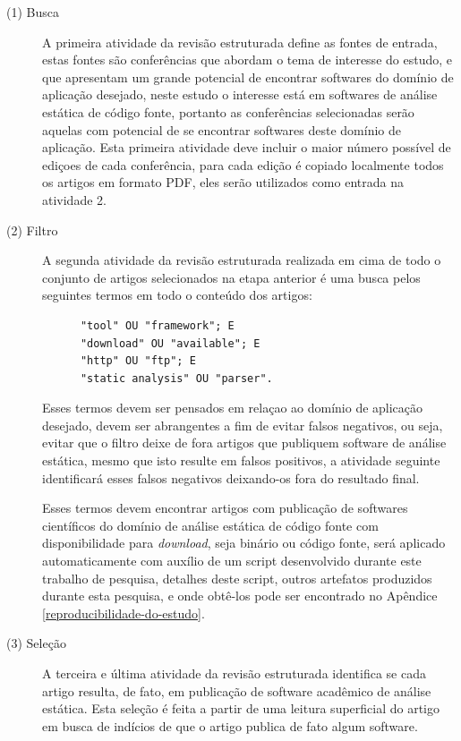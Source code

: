 \begin{description}

  \item[(1) Busca]
    A primeira atividade da revisão estruturada define as fontes de entrada,
    estas fontes são conferências que abordam o tema de interesse do estudo, e
    que apresentam um grande potencial de encontrar softwares do domínio de
    aplicação desejado, neste estudo o interesse está em softwares de análise
    estática de código fonte, portanto as conferências selecionadas serão
    aquelas com potencial de se encontrar softwares deste domínio de aplicação.
    Esta primeira atividade deve incluir o maior número possível de ediçoes de
    cada conferência, para cada edição é copiado localmente todos os artigos em
    formato PDF, eles serão utilizados como entrada na atividade 2.

  \item[(2) Filtro]
    A segunda atividade da revisão estruturada realizada em cima de todo o
    conjunto de artigos selecionados na etapa anterior é uma busca pelos
    seguintes termos em todo o conteúdo dos artigos:

    \begin{verbatim}
      "tool" OU "framework"; E
      "download" OU "available"; E
      "http" OU "ftp"; E
      "static analysis" OU "parser".
    \end{verbatim}

    Esses termos devem ser pensados em relaçao ao domínio de aplicação
    desejado, devem ser abrangentes a fim de evitar falsos negativos, ou seja,
    evitar que o filtro deixe de fora artigos que publiquem software de análise
    estática, mesmo que isto resulte em falsos positivos, a atividade seguinte
    identificará esses falsos negativos deixando-os fora do resultado final.

    Esses termos devem encontrar artigos com publicação de softwares
    científicos do domínio de análise estática de código fonte com
    disponibilidade para {\it download}, seja binário ou código fonte, será
    aplicado automaticamente com auxílio de um script desenvolvido durante este
    trabalho de pesquisa, detalhes deste script, outros artefatos produzidos
    durante esta pesquisa, e onde obtê-los pode ser encontrado no Apêndice
    \ref{reproducibilidade-do-estudo}.

  \item[(3) Seleção]
    A terceira e última atividade da revisão estruturada identifica se cada
    artigo resulta, de fato, em publicação de software acadêmico de análise
    estática. Esta seleção é feita a partir de uma leitura superficial do
    artigo em busca de indícios de que o artigo publica de fato algum software.


\end{description}
